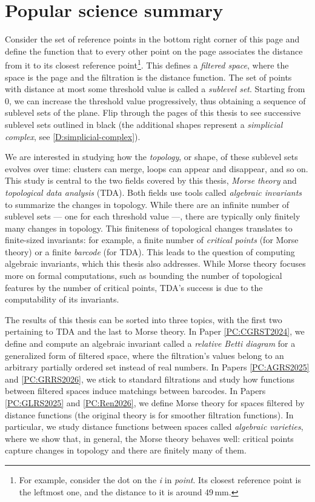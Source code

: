 \chapter{Popular science summary}

Consider the set of reference points in the bottom right corner of this page and define the function that to every other point on the page associates the distance from it to its closest reference point\footnote{For example, consider the dot on the \textit{i} in \textit{point}. Its closest reference point is the leftmost one, and the distance to it is around 49\,mm.}. This defines a \emph{filtered space}, where the space is the page and the filtration is the distance function. The set of points with distance at most some threshold value is called a \emph{sublevel set}. Starting from $0$, we can increase the threshold value progressively, thus obtaining a sequence of sublevel sets of the plane. Flip through the pages of this thesis to see successive sublevel sets outlined in black (the additional shapes represent a \emph{simplicial complex}, see \cref{D:simplicial-complex}).

We are interested in studying how the \emph{topology}, or shape, of these sublevel sets evolves over time: clusters can merge, loops can appear and disappear, and so on. This study is central to the two fields covered by this thesis, \emph{Morse theory} and \emph{topological data analysis} (TDA). Both fields use tools called \emph{algebraic invariants} to summarize the changes in topology. While there are an infinite number of sublevel sets --- one for each threshold value ---, there are typically only finitely many changes in topology. This finiteness of topological changes translates to finite-sized invariants: for example, a finite number of \emph{critical points} (for Morse theory) or a finite \emph{barcode} (for TDA). This leads to the question of computing algebraic invariants, which this thesis also addresses. While Morse theory focuses more on formal computations, such as bounding the number of topological features by the number of critical points, TDA's success is due to the computability of its invariants.

The results of this thesis can be sorted into three topics, with the first two pertaining to TDA and the last to Morse theory. In Paper \ref{PC:CGRST2024}, we define and compute an algebraic invariant called a \emph{relative Betti diagram} for a generalized form of filtered space, where the filtration's values belong to an arbitrary partially ordered set instead of real numbers. In Papers \ref{PC:AGRS2025} and \ref{PC:GRRS2026}, we stick to standard filtrations and study how functions between filtered spaces induce matchings between barcodes. In Papers \ref{PC:GLRS2025} and \ref{PC:Ren2026}, we define Morse theory for spaces filtered by distance functions (the original theory is for smoother filtration functions). In particular, we study distance functions between spaces called \emph{algebraic varieties}, where we show that, in general, the Morse theory behaves well: critical points capture changes in topology and there are finitely many of them.

